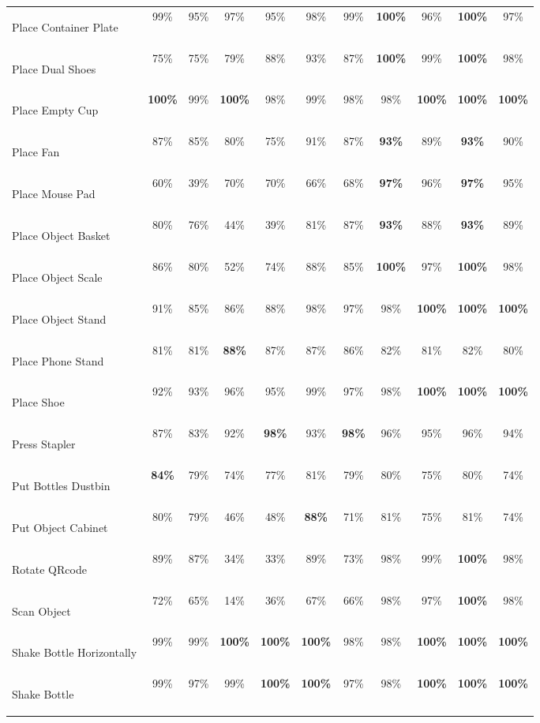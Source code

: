 \documentclass{article}
\newcommand{\bestcell}[1]{\cellcolor{bestlavender}\textbf{#1}}
\begin{document}
\begin{table}[htbp]
\begin{tabular}{>{\itshape\raggedright\arraybackslash}p{3.35cm}cccccccccc}
Place Container Plate & 99\% & 95\% & 97\% & 95\% & 98\% & 99\% & \bestcell{100\%} & 96\% & \bestcell{100\%} & 97\% \\
Place Dual Shoes & 75\% & 75\% & 79\% & 88\% & 93\% & 87\% & \bestcell{100\%} & 99\% & \bestcell{100\%} & 98\% \\
Place Empty Cup & \bestcell{100\%} & 99\% & \bestcell{100\%} & 98\% & 99\% & 98\% & 98\% & \bestcell{100\%} & \bestcell{100\%} & \bestcell{100\%} \\
Place Fan & 87\% & 85\% & 80\% & 75\% & 91\% & 87\% & \bestcell{93\%} & 89\% & \bestcell{93\%} & 90\% \\
Place Mouse Pad & 60\% & 39\% & 70\% & 70\% & 66\% & 68\% & \bestcell{97\%} & 96\% & \bestcell{97\%} & 95\% \\
Place Object Basket & 80\% & 76\% & 44\% & 39\% & 81\% & 87\% & \bestcell{93\%} & 88\% & \bestcell{93\%} & 89\% \\
Place Object Scale & 86\% & 80\% & 52\% & 74\% & 88\% & 85\% & \bestcell{100\%} & 97\% & \bestcell{100\%} & 98\% \\
Place Object Stand & 91\% & 85\% & 86\% & 88\% & 98\% & 97\% & 98\% & \bestcell{100\%} & \bestcell{100\%} & \bestcell{100\%} \\
Place Phone Stand & 81\% & 81\% & \bestcell{88\%} & 87\% & 87\% & 86\% & 82\% & 81\% & 82\% & 80\% \\
Place Shoe & 92\% & 93\% & 96\% & 95\% & 99\% & 97\% & 98\% & \bestcell{100\%} & \bestcell{100\%} & \bestcell{100\%} \\
Press Stapler & 87\% & 83\% & 92\% & \bestcell{98\%} & 93\% & \bestcell{98\%} & 96\% & 95\% & 96\% & 94\% \\
Put Bottles Dustbin & \bestcell{84\%} & 79\% & 74\% & 77\% & 81\% & 79\% & 80\% & 75\% & 80\% & 74\% \\
Put Object Cabinet & 80\% & 79\% & 46\% & 48\% & \bestcell{88\%} & 71\% & 81\% & 75\% & 81\% & 74\% \\
Rotate QRcode & 89\% & 87\% & 34\% & 33\% & 89\% & 73\% & 98\% & 99\% & \bestcell{100\%} & 98\% \\
Scan Object & 72\% & 65\% & 14\% & 36\% & 67\% & 66\% & 98\% & 97\% & \bestcell{100\%} & 98\% \\
Shake Bottle Horizontally & 99\% & 99\% & \bestcell{100\%} & \bestcell{100\%} & \bestcell{100\%} & 98\% & 98\% & \bestcell{100\%} & \bestcell{100\%} & \bestcell{100\%} \\
Shake Bottle & 99\% & 97\% & 99\% & \bestcell{100\%} & \bestcell{100\%} & 97\% & 98\% & \bestcell{100\%} & \bestcell{100\%} & \bestcell{100\%} \\

\end{tabular}
\end{table}
\end{document}
